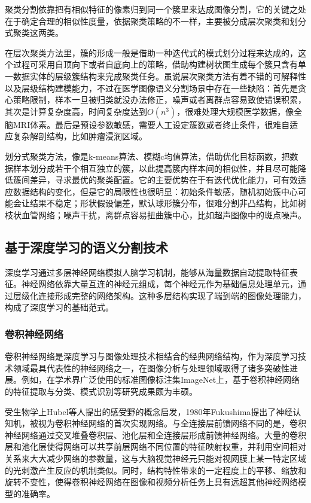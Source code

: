 聚类分割依靠把有相似特征的像素归到同一个簇里来达成图像分割，它的关键之处在于确定合理的相似性度量，依据聚类策略的不一样，主要被分成层次聚类和划分式聚类这两类。

在层次聚类方法里，簇的形成一般是借助一种迭代式的模式划分过程来达成的，这个过程可采用自顶向下或者自底向上的策略，借助构建树状图生成每个簇只含有单一数据实体的层级簇结构来完成聚类任务。虽说层次聚类方法有着不错的可解释性以及层级结构建模能力，不过在医学图像语义分割场景中存在一些缺陷：首先是贪心策略限制，样本一旦被归类就没办法修正，噪声或者离群点容易致使错误积累，其次是计算复杂度高，时间复杂度达到$O(n^3)$，很难处理大规模医学数据，像全脑MRI体素。最后是预设参数敏感，需要人工设定簇数或者终止条件，很难自适应复杂解剖结构，比如肿瘤浸润区域。

划分式聚类方法，像是k-means算法、模糊c均值算法，借助优化目标函数，把数据样本划分成若干个相互独立的簇，以此提高簇内样本间的相似性，并且尽可能降低簇间差异，寻求最优的聚类配置。它的主要优势在于有迭代优化能力，可有效适应数据结构的变化，但是它的局限性也很明显：初始条件敏感，随机初始簇中心可能会让结果不稳定；形状假设偏差，默认球形簇分布，很难分割非凸结构，比如树枝状血管网络；噪声干扰，离群点容易扭曲簇中心，比如超声图像中的斑点噪声。

\subsection{基于深度学习的语义分割技术}

深度学习通过多层神经网络模拟人脑学习机制，能够从海量数据自动提取特征表征。神经网络依靠大量互连的神经元组成，每个神经元作为基础信息处理单元，通过层级化连接形成完整的网络架构\cite{qiu2020nndl}。这种多层结构实现了端到端的图像处理能力，构成了深度学习的基础范式。

\subsubsection{卷积神经网络}

卷积神经网络是深度学习与图像处理技术相结合的经典网络结构，作为深度学习技术领域最具代表性的神经网络之一，在图像分析与处理领域取得了诸多突破性进展。例如，在学术界广泛使用的标准图像标注集ImageNet上，基于卷积神经网络的特征提取与分类、模式识别等研究成果颇为丰硕。

受生物学上Hubel等人\cite{hubel1962}提出的感受野的概念启发，1980年Fukushima\cite{fukushima1980}提出了神经认知机，被视为卷积神经网络的首次实现网络。与全连接层前馈网络不同的是，卷积神经网络通过交叉堆叠卷积层、池化层和全连接层形成前馈神经网络。大量的卷积层和池化层使得网络可以共享前层网络不同位置的特征映射权重，并利用空间相对关系来大大减少网络的参数量，这与大脑视觉神经元只能对视网膜上某一特定区域的光刺激产生反应的机制类似。同时，结构特性带来的一定程度上的平移、缩放和旋转不变性，使得卷积神经网络在图像和视频分析任务上具有远超其他神经网络模型的准确率。

